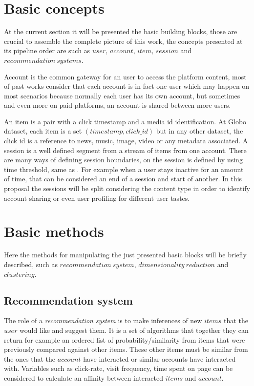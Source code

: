 \documentclass[ecp,tc,english]{iiufrgs}
\begin{document}
    \section{Basic concepts}
    At the current section it will be presented the basic building blocks, those are crucial to assemble the complete picture of this work, the concepts presented at its pipeline order are such as \(user\), \(account\), \(item\), \(session\) and \(recommendation\ systems\).
        
        Account is the common gateway for an user to access the platform content, most of past works consider that each account is in fact one user which may happen on most scenarios because normally each user has its own account, but sometimes and even more on paid platforms, an account is shared between more users.
    
        An item is a pair with a click timestamp and a media id identification. 
        At Globo dataset, each item is a  set \((timestamp, click\_id)\) but 
        in any other dataset, the click id is a reference to news, music, 
        image, video or any metadata associated. A session is a well defined 
        segment from a stream of items from one account. There are many ways 
        of defining session boundaries, on \cite{10.1145/362883.362920} the session 
        is defined by using time threshold, same as \cite{10.1145/2736277.2741117}. 
        For example when a user stays inactive for an amount of time, that can be 
        considered an end of a session and start of another. In this proposal the 
        sessions will be split considering the content type in order to identify 
        account sharing or even user profiling for different user tastes.

    \section{Basic methods}
    Here the methods for manipulating the just presented basic blocks will be briefly described, such as \(recommendation\ system\), \(dimensionality\ reduction\) and \(clustering\).
    
        \subsection{Recommendation system}
        The role of a \textit{recommendation system} is to make inferences of new \(items\) that the \(user\) would like and suggest them. It is a set of algorithms that together they can return for example an ordered list of probability/similarity from items that were previously compared against other items. These other items must be similar from the ones that the \(account\) have interacted or similar accounts have interacted with.
        Variables such as click-rate, visit frequency, time spent on page can be considered to calculate an affinity between interacted \(items\) and \(account\).
\end{document}
